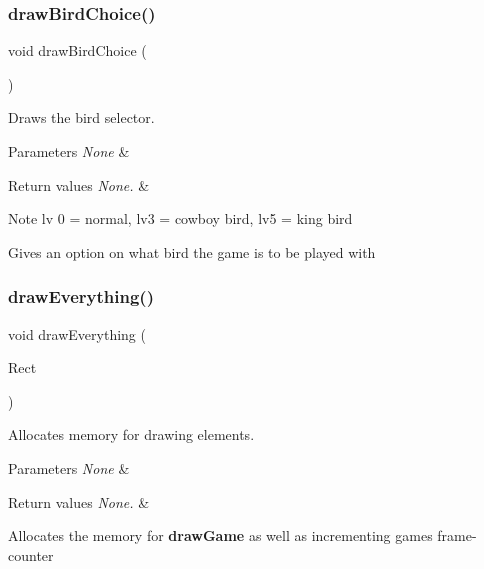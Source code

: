 \subsubsection{\texorpdfstring{draw\+Bird\+Choice()}{drawBirdChoice()}}
{\footnotesize\ttfamily void draw\+Bird\+Choice (\begin{DoxyParamCaption}{ }\end{DoxyParamCaption})}



Draws the bird selector. 


\begin{DoxyParams}{Parameters}
{\em None} & \\
\hline
\end{DoxyParams}

\begin{DoxyRetVals}{Return values}
{\em None.} & \\
\hline
\end{DoxyRetVals}
\begin{DoxyNote}{Note}
lv 0 = normal, lv3 = cowboy bird, lv5 = king bird
\end{DoxyNote}
Gives an option on what bird the game is to be played with \mbox{\label{group___flappy___bird_ga5b822966aed05dfd5193feab196a3239}} 
\subsubsection{\texorpdfstring{draw\+Everything()}{drawEverything()}}
{\footnotesize\ttfamily void draw\+Everything (\begin{DoxyParamCaption}\item[{G\+U\+I\+\_\+\+R\+E\+CT}]{Rect }\end{DoxyParamCaption})}



Allocates memory for drawing elements. 


\begin{DoxyParams}{Parameters}
{\em None} & \\
\hline
\end{DoxyParams}

\begin{DoxyRetVals}{Return values}
{\em None.} & \\
\hline
\end{DoxyRetVals}
Allocates the memory for {\bfseries draw\+Game} as well as incrementing games frame-\/counter \mbox{\label{group___flappy___bird_ga30accaeacb835fd678ae029b46c79049}} 
